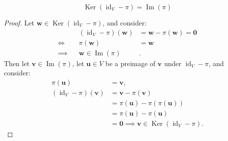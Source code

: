 \documentclass[11pt]{article}
\newcommand{\vect}[1]{\bm{#1}}      %
\DeclareMathOperator{\Ker}{Ker}
\DeclareMathOperator{\Img}{Im}
\DeclareMathOperator{\id}{id}
\theoremstyle{definition}
\theoremstyle{plain}
\theoremstyle{remark}
\begin{document}
\begin{enumerate}
\begin{enumerate}
                    \[
                        \Ker(\id_V - \pi) = \Img(\pi)
                    \]
                    \begin{proof}
                        Let $\vect{w} \in \Ker(\id_V - \pi)$, and consider:
                        \[
                            \begin{alignedat}{2}
                                         &  & (\id_V - \pi)(\vect{w}) & = \vect{w} - \pi(\vect{w}) = \vect{0} \\
                                \iff     &  & \pi(\vect{w})           & = \vect{w}                            \\
                                \implies &  & \vect{w} \in \Img(\pi)  & .
                            \end{alignedat}
                        \]
                        Then let $\vect{v} \in \Img(\pi)$, let $\vect{u} \in V$ be a preimage of $\vect{v}$ under $\id_V - \pi$, and consider:
                        \[
                            \begin{aligned}
                                \pi(\vect{u})           & = \vect{v},                                         \\
                                (\id_V - \pi)(\vect{v}) & = \vect{v} - \pi(\vect{v})                          \\
                                                        & = \pi(\vect{u}) - \pi(\pi(\vect{u}))                \\
                                                        & = \pi(\vect{u}) - \pi(\vect{u})                     \\
                                                        & = \vect{0} \implies \vect{v} \in \Ker(\id_V - \pi).
                            \end{aligned}
                        \]
                    \end{proof}

          \end{enumerate}

\end{enumerate}
\end{document}
